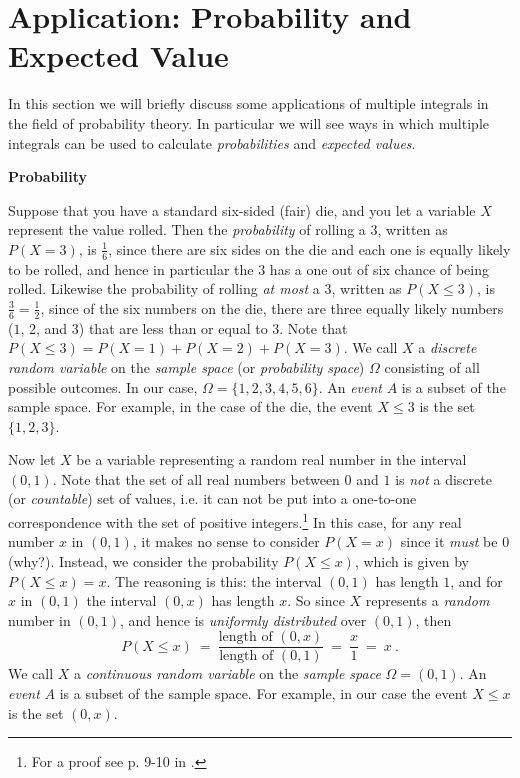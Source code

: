 \section{Application: Probability and Expected Value}
In this section we will briefly discuss some applications of multiple integrals in the field of
probability theory. In particular we will see ways in which multiple integrals can be used to calculate
\emph{probabilities} and \emph{expected values}.\vspace{4mm}

\par\noindent\textbf{\large{Probability}}\normalsize\vspace{2mm}

Suppose that you have a standard six-sided (fair) die, and you let a variable $X$ represent the value rolled. Then the
\emph{probability} of rolling a $3$, written as $P(X=3)$, is $\frac{1}{6}$, since there are six sides on the die and
each one is equally likely to be rolled, and hence in particular the $3$ has a one out of six chance of being rolled.
Likewise the probability of rolling \emph{at most} a $3$, written as $P(X \le 3)$, is $\frac{3}{6} = \frac{1}{2}$,
since of the six numbers on the die, there are three equally likely numbers ($1$, $2$, and $3$) that are less than or
equal to $3$. Note that $P(X \le 3) = P(X=1) + P(X=2) + P(X=3)$. We call $X$ a \emph{discrete random variable} on the
\emph{sample space} (or \emph{probability space}) $\Omega$ consisting of all possible outcomes. In our case,
$\Omega = \lbrace 1,2,3,4,5,6 \rbrace$.
An \emph{event} $A$ is a subset of the sample space. For example, in the case of the die, the event $X \le 3$ is the set
$\lbrace 1,2,3 \rbrace$.

Now let $X$ be a variable representing a random real number in the interval $(0,1)$. Note that the set of all real
numbers between $0$ and $1$ is \emph{not} a discrete (or \emph{countable}) set of values, i.e. it can not be put into a
one-to-one correspondence with the set of positive integers.\footnote{For a proof see p. 9-10 in .}
In this case, for any real number
$x$ in $(0,1)$, it makes no sense to consider $P(X=x)$ since it \emph{must} be $0$ (why?). Instead, we consider the
probability $P(X \le x)$, which is given by $P(X \le x) = x$. The reasoning is this: the interval $(0,1)$ has length $1$,
and for $x$ in $(0,1)$ the interval $(0,x)$ has length $x$. So since $X$ represents a \emph{random} number in $(0,1)$,
and hence is \emph{uniformly distributed} over $(0,1)$, then
\begin{displaymath}
 P(X \le x) ~=~ \frac{\text{length of $(0,x)$}}{\text{length of $(0,1)$}} ~=~ \frac{x}{1} ~=~ x ~.
\end{displaymath}
We call $X$ a \emph{continuous random variable} on the \emph{sample space} $\Omega = (0,1)$. An \emph{event} $A$ is a
subset of the sample space. For example, in our case the event $X \le x$ is the set $(0,x)$.

